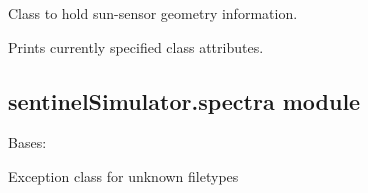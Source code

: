 \documentclass[letterpaper,10pt,english]{sphinxmanual}
\begin{document}
\begin{fulllineitems}
\label{source/sentinelSimulator:sentinelSimulator.satelliteGeometry.sensorGeometry}
Class to hold sun-sensor geometry information.

\begin{fulllineitems}
\label{source/sentinelSimulator:sentinelSimulator.satelliteGeometry.sensorGeometry.printGeom}
Prints currently specified class attributes.

\end{fulllineitems}


\end{fulllineitems}



\subsection{sentinelSimulator.spectra module}
\label{source/sentinelSimulator:module-sentinelSimulator.spectra}\label{source/sentinelSimulator:sentinelsimulator-spectra-module}

\begin{fulllineitems}
\label{source/sentinelSimulator:sentinelSimulator.spectra.UnknownFileType}
Bases: 

Exception class for unknown filetypes

\end{fulllineitems}

\end{document}
